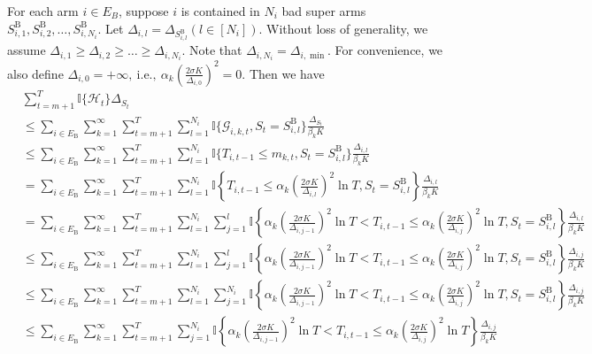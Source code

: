 \documentclass[opre,sglanonrev]{informs4}
\begin{document}
\begin{appendices}
For each arm $i\in E_B$, suppose $i$ is contained in $N_i$ bad super arms $S_{i,1}^\mathrm{B},S_{i,2}^\mathrm{B},\ldots,S_{i,N_i}^\mathrm{B}$. Let $\Delta_{i,l} = \Delta_{S_{i,l}^\mathrm{B}}(l\in[N_i])$. Without loss of generality, we assume $\Delta_{i,1}\geq\Delta_{i,2}\geq\ldots\geq\Delta_{i,N_i}$. Note that $\Delta_{i,N_i}=\Delta_{i,\min}$. For convenience, we also define $\Delta_{i,0}=+\infty,\mathrm{~i.e.,~}\alpha_k\left(\frac{2\sigma K}{\Delta_{i,0}}\right)^2=0$. Then we have
$$\begin{aligned}
 & \sum_{t=m+1}^T\mathbb{I}\{\mathcal{H}_t\}\Delta_{S_t} \\
 & \leq\sum_{i\in E_\mathrm{B}}\sum_{k=1}^\infty\sum_{t=m+1}^T\sum_{l=1}^{N_i}\mathbb{I}\{\mathcal{G}_{i,k,t},S_t=S_{i,l}^\mathrm{B}\}\frac{\Delta_{S_t}}{\beta_kK} \\
 & \leq\sum_{i\in E_\mathrm{B}}\sum_{k=1}^\infty\sum_{t=m+1}^T\sum_{l=1}^{N_i}\mathbb{I}\{T_{i,t-1}\leq m_{k,t},S_t=S_{i,l}^\mathrm{B}\}\frac{\Delta_{i,l}}{\beta_kK} \\
 & =\sum_{i\in E_\mathrm{B}}\sum_{k=1}^\infty\sum_{t=m+1}^T\sum_{l=1}^{N_i}\mathbb{I}\left\{T_{i,t-1}\leq\alpha_k\left(\frac{2\sigma K}{\Delta_{i,l}}\right)^2\ln T,S_t=S_{i,l}^\mathrm{B}\right\}\frac{\Delta_{i,l}}{\beta_kK} \\
 & =\sum_{i\in E_{\mathrm{B}}}\sum_{k=1}^{\infty}\sum_{t=m+1}^{T}\sum_{l=1}^{N_{i}}\sum_{j=1}^{l}\mathbb{I}\left\{\alpha_k\left(\frac{2\sigma K}{\Delta_{i,j-1}}\right)^{2}\ln T<T_{i,t-1}\leq\alpha_k\left(\frac{2\sigma K}{\Delta_{i,j}}\right)^{2}\ln T,S_{t}=S_{i,l}^{\mathrm{B}}\right\}\frac{\Delta_{i,l}}{\beta_{k}K} \\
 &\leq\sum_{i\in E_{\mathrm{B}}}\sum_{k=1}^{\infty}\sum_{t=m+1}^{T}\sum_{l=1}^{N_{i}}\sum_{j=1}^{l}\mathbb{I}\left\{\alpha_k\left(\frac{2\sigma K}{\Delta_{i,j-1}}\right)^{2}\ln T<T_{i,t-1}\leq\alpha_k\left(\frac{2\sigma K}{\Delta_{i,j}}\right)^{2}\ln T,S_{t}=S_{i,l}^{\mathrm{B}}\right\}\frac{\Delta_{i,j}}{\beta_{k}K}\\
 &\leq\sum_{i\in E_{\mathrm{B}}}\sum_{k=1}^{\infty}\sum_{t=m+1}^{T}\sum_{l=1}^{N_{i}}\sum_{j=1}^{N_{i}}\mathbb{I}\left\{\alpha_k\left(\frac{2\sigma K}{\Delta_{i,j-1}}\right)^{2}\ln T<T_{i,t-1}\leq\alpha_k\left(\frac{2\sigma K}{\Delta_{i,j}}\right)^{2}\ln T,S_{t}=S_{i,l}^{\mathrm{B}}\right\}\frac{\Delta_{i,j}}{\beta_{k}K}\\
 & \leq\sum_{i\in E_\mathrm{B}}\sum_{k=1}^\infty\sum_{t=m+1}^T\sum_{j=1}^{N_i}\mathbb{I}\left\{\alpha_k\left(\frac{2\sigma K}{\Delta_{i,j-1}}\right)^2\ln T<T_{i,t-1}\leq\alpha_k\left(\frac{2\sigma K}{\Delta_{i,j}}\right)^2\ln T\right\}\frac{\Delta_{i,j}}{\beta_kK}\\

\end{aligned}$$
\end{appendices}
\end{document}

